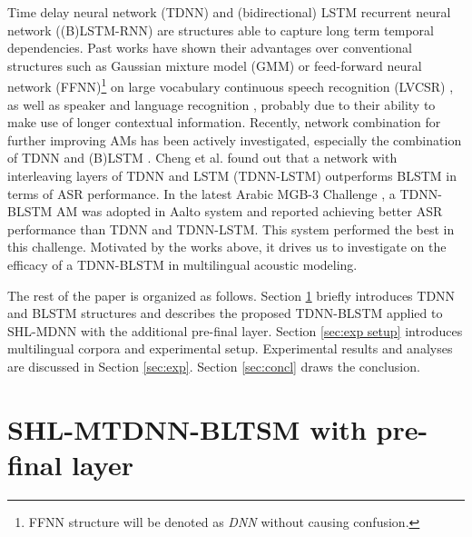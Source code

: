 \documentclass[a4paper]{article}
\begin{document}
Time delay neural network (TDNN) \cite{peddinti2015time} and (bidirectional) LSTM recurrent neural network ((B)LSTM-RNN) \cite{sak2014long,graves2013hybrid} are structures able to capture long term temporal dependencies.
Past works have shown their advantages over conventional structures such as Gaussian mixture model (GMM) or feed-forward neural network (FFNN)\footnote{\label{footnote:ffnn}FFNN structure will be denoted as \textit{DNN} without causing confusion.} on large vocabulary continuous speech recognition (LVCSR) \cite{peddinti2015time,sak2014long,graves2013hybrid}, as well as speaker \cite{zheng2015exploring} and language recognition \cite{qian2017improving}, probably due to their  ability to make use of longer contextual information.
Recently, network combination for further improving AMs
 has been actively investigated, especially the combination of TDNN and (B)LSTM \cite{chengexploration,smit2017aalto}. Cheng et al. \cite{chengexploration} found out that a network with interleaving layers of TDNN and LSTM (TDNN-LSTM)
outperforms BLSTM in terms of ASR performance.
In the latest Arabic MGB-3 Challenge \cite{ali2017speech},
 a TDNN-BLSTM AM was adopted in Aalto system \cite{smit2017aalto}  and reported achieving better ASR performance than TDNN and TDNN-LSTM. This system performed the best in this challenge.
Motivated by the works above, it drives us to investigate on the efficacy of a TDNN-BLSTM  in multilingual acoustic modeling.


The rest of the paper is organized as follows. Section \ref{sec:SHL-MTDNN-BLSTM} briefly introduces TDNN and BLSTM structures and describes the proposed TDNN-BLSTM applied to SHL-MDNN with the additional pre-final layer. Section \ref{sec:exp setup} introduces multilingual corpora and experimental setup. Experimental results and analyses are discussed in Section \ref{sec:exp}. Section \ref{sec:concl} draws the conclusion.
\section{SHL-MTDNN-BLTSM with pre-final layer}
\label{sec:SHL-MTDNN-BLSTM}
\end{document}

